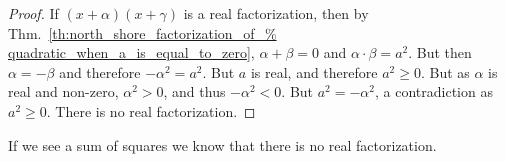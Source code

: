 \documentclass[crop=false,class=book,oneside]{standalone}
\begin{document}
        \begin{proof}
            If $(x+\alpha)(x+\gamma)$ is a real factorization,
            then by Thm.~\ref{th:north_shore_factorization_of_%
                              quadratic_when_a_is_equal_to_zero},
            $\alpha+\beta=0$ and $\alpha\cdot\beta=a^{2}$. But then
            $\alpha=-\beta$ and therefore $-\alpha^{2}=a^{2}$. But
            $a$ is real, and therefore $a^{2}\geq 0$. But as
            $\alpha$ is real and non-zero, $\alpha^{2}>0$, and
            thus $-\alpha^{2}<0$. But $a^{2}=-\alpha^{2}$,
            a contradiction as $a^{2}\geq 0$. There is no real factorization.
        \end{proof}
        \begin{remark}
        If we see a sum of squares we know that there is no real factorization.
        \end{remark}
\end{document}
